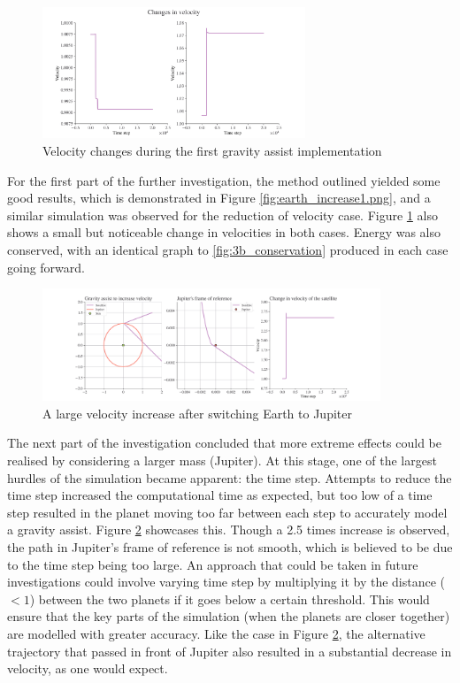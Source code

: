 \documentclass[12pt, english]{report}
\begin{document}
\begin{figure}[ht]
    \centering
    \includegraphics[width=0.7\textwidth]{graphics/earth_velocity_change1.png}
    \caption{Velocity changes during the first gravity assist implementation}
    \label{fig:earth_change1}
\end{figure}


\normalsize{\noindent For the first part of the further investigation, the method outlined yielded some good results, which is demonstrated in Figure \ref{fig:earth_increase1.png}, and a similar simulation was observed for the reduction of velocity case. Figure \ref{fig:earth_change1} also shows a small but noticeable change in velocities in both cases. Energy was also conserved, with an identical graph to \ref{fig:3b_conservation} produced in each case going forward.

\begin{figure}[ht]
    \centering
    \includegraphics[width=0.9\textwidth]{graphics/jupiter_big_increase.png}
    \caption{A large velocity increase after switching Earth to Jupiter}
    \label{fig:jupiter_big_increase}
\end{figure}

The next part of the investigation concluded that more extreme effects could be realised by considering a larger mass (Jupiter). At this stage, one of the largest hurdles of the simulation became apparent: the time step. Attempts to reduce the time step increased the computational time as expected, but too low of a time step resulted in the planet moving too far between each step to accurately model a gravity assist. Figure \ref{fig:jupiter_big_increase} showcases this. Though a 2.5 times increase is observed, the path in Jupiter's frame of reference is not smooth, which is believed to be due to the time step being too large. An approach that could be taken in future investigations could involve varying time step by multiplying it by the distance ($<1$) between the two planets if it goes below a certain threshold. This would ensure that the key parts of the simulation (when the planets are closer together) are modelled with greater accuracy. Like the case in Figure \ref{fig:jupiter_big_increase}, the alternative trajectory that passed in front of Jupiter also resulted in a substantial decrease in velocity, as one would expect.

}
\end{document}
